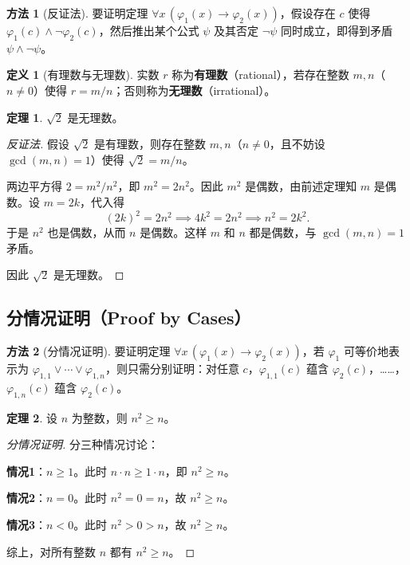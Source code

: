 \documentclass[UTF8,11pt,a4paper]{ctexbook}   %
\theoremstyle{definition}
\newtheorem{definition}{定义}[section]
\newtheorem{theorem}{定理}[section]
\newtheorem{method}{方法}[section]
\begin{document}
\begin{method}[反证法]
要证明定理 $\forall x\,(\varphi_1(x) \to \varphi_2(x))$，假设存在 $c$ 使得 $\varphi_1(c) \land \neg\varphi_2(c)$，然后推出某个公式 $\psi$ 及其否定 $\neg\psi$ 同时成立，即得到矛盾 $\psi \land \neg\psi$。
\end{method}

\begin{definition}[有理数与无理数]
实数 $r$ 称为\textbf{有理数}（rational），若存在整数 $m,n$（$n \neq 0$）使得 $r = m/n$；否则称为\textbf{无理数}（irrational）。
\end{definition}

\begin{theorem}
$\sqrt{2}$ 是无理数。
\end{theorem}

\begin{proof}[反证法]
假设 $\sqrt{2}$ 是有理数，则存在整数 $m,n$（$n \neq 0$，且不妨设 $\gcd(m,n)=1$）使得 $\sqrt{2} = m/n$。

两边平方得 $2 = m^2/n^2$，即 $m^2 = 2n^2$。因此 $m^2$ 是偶数，由前述定理知 $m$ 是偶数。设 $m = 2k$，代入得
\[
(2k)^2 = 2n^2 \implies 4k^2 = 2n^2 \implies n^2 = 2k^2.
\]
于是 $n^2$ 也是偶数，从而 $n$ 是偶数。这样 $m$ 和 $n$ 都是偶数，与 $\gcd(m,n)=1$ 矛盾。

因此 $\sqrt{2}$ 是无理数。
\end{proof}

\subsection{分情况证明（Proof by Cases）}

\begin{method}[分情况证明]
要证明定理 $\forall x\,(\varphi_1(x) \to \varphi_2(x))$，若 $\varphi_1$ 可等价地表示为 $\varphi_{1,1} \lor \cdots \lor \varphi_{1,n}$，则只需分别证明：对任意 $c$，$\varphi_{1,1}(c)$ 蕴含 $\varphi_2(c)$，……，$\varphi_{1,n}(c)$ 蕴含 $\varphi_2(c)$。
\end{method}

\begin{theorem}
设 $n$ 为整数，则 $n^2 \geq n$。
\end{theorem}

\begin{proof}[分情况证明]
分三种情况讨论：

\textbf{情况1}：$n \geq 1$。此时 $n \cdot n \geq 1 \cdot n$，即 $n^2 \geq n$。

\textbf{情况2}：$n = 0$。此时 $n^2 = 0 = n$，故 $n^2 \geq n$。

\textbf{情况3}：$n < 0$。此时 $n^2 > 0 > n$，故 $n^2 \geq n$。

综上，对所有整数 $n$ 都有 $n^2 \geq n$。
\end{proof}
\end{document}
